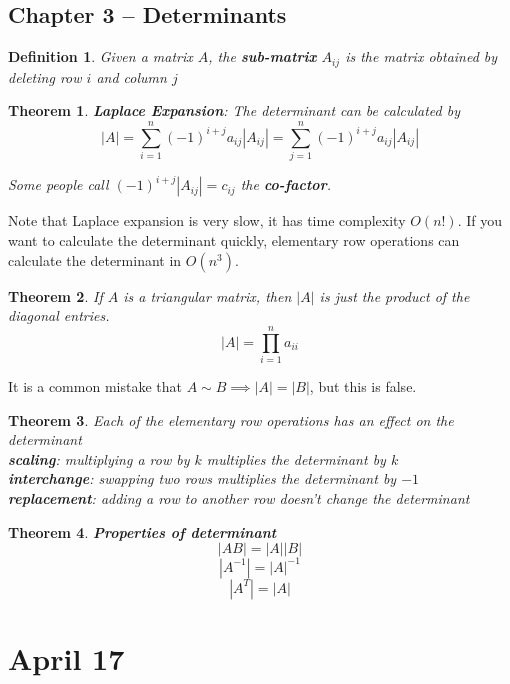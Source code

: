 \documentclass[11pt]{article}
\newtheorem{thm}{Theorem}
\newtheorem{defn}{Definition}
\begin{document}
\subsection{Chapter 3 -- Determinants}

\begin{defn}
  Given a matrix $A$, the \textbf{sub-matrix} $A_{ij}$ is the matrix obtained by deleting row $i$ and column $j$
\end{defn}

\begin{thm}
  \textbf{Laplace Expansion}: The determinant can be calculated by
  \[|A| = \sum_{i=1}^{n} (-1)^{i+j} a_{ij}|A_{ij}|= \sum_{j=1}^{n} (-1)^{i+j} a_{ij}|A_{ij}|\]

  Some people call $(-1)^{i+j}|A_{ij}| = c_{ij}$ the \textbf{co-factor}.
\end{thm}

Note that Laplace expansion is very slow, it has time complexity $O(n!)$. If you want to calculate the determinant quickly, elementary row operations can
calculate the determinant in $O(n^{3})$.

\begin{thm}
  If $A$ is a triangular matrix, then $|A|$ is just the product of the diagonal entries.
  \[|A| = \prod_{i=1}^{n}a_{ii}\]
\end{thm}

It is a common mistake that $A \sim B \implies |A| =  |B|$, but this is false.

\begin{thm}
  Each of the elementary row operations has an effect on the determinant\\
  \textbf{scaling}: multiplying a row by $k$ multiplies the determinant by $k$ \\
  \textbf{interchange}: swapping two rows multiplies the determinant by $-1$ \\
  \textbf{replacement}: adding a row to another row doesn't change the determinant \\
\end{thm}

\begin{thm}
  \textbf{Properties of determinant}
  \[|AB|=|A||B|\]
  \[|A^{-1}|=|A|^{-1}\]
  \[|A^{T}|=|A|\]
\end{thm}

\section{April 17}
\end{document}
